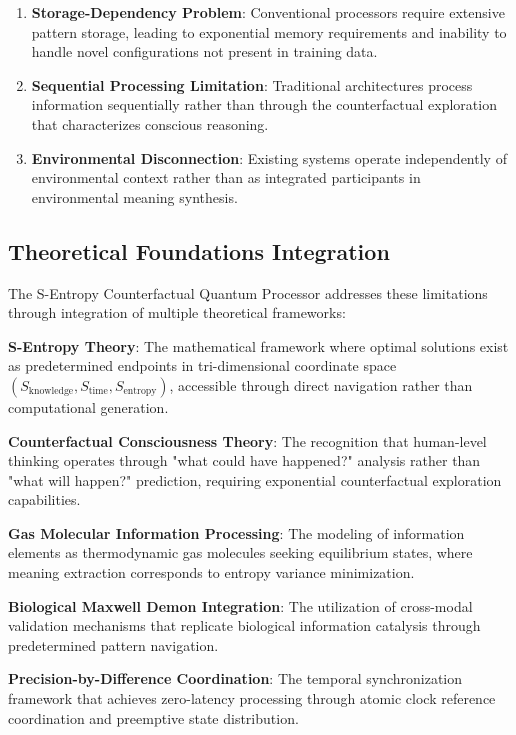 \documentclass[12pt,a4paper]{article}
\begin{document}
\begin{enumerate}
\item \textbf{Storage-Dependency Problem}: Conventional processors require extensive pattern storage, leading to exponential memory requirements and inability to handle novel configurations not present in training data.

\item \textbf{Sequential Processing Limitation}: Traditional architectures process information sequentially rather than through the counterfactual exploration that characterizes conscious reasoning.

\item \textbf{Environmental Disconnection}: Existing systems operate independently of environmental context rather than as integrated participants in environmental meaning synthesis.
\end{enumerate}

\subsection{Theoretical Foundations Integration}

The S-Entropy Counterfactual Quantum Processor addresses these limitations through integration of multiple theoretical frameworks:

\textbf{S-Entropy Theory}: The mathematical framework where optimal solutions exist as predetermined endpoints in tri-dimensional coordinate space $(S_{\text{knowledge}}, S_{\text{time}}, S_{\text{entropy}})$, accessible through direct navigation rather than computational generation.

\textbf{Counterfactual Consciousness Theory}: The recognition that human-level thinking operates through "what could have happened?" analysis rather than "what will happen?" prediction, requiring exponential counterfactual exploration capabilities.

\textbf{Gas Molecular Information Processing}: The modeling of information elements as thermodynamic gas molecules seeking equilibrium states, where meaning extraction corresponds to entropy variance minimization.

\textbf{Biological Maxwell Demon Integration}: The utilization of cross-modal validation mechanisms that replicate biological information catalysis through predetermined pattern navigation.

\textbf{Precision-by-Difference Coordination}: The temporal synchronization framework that achieves zero-latency processing through atomic clock reference coordination and preemptive state distribution.
\end{document}
